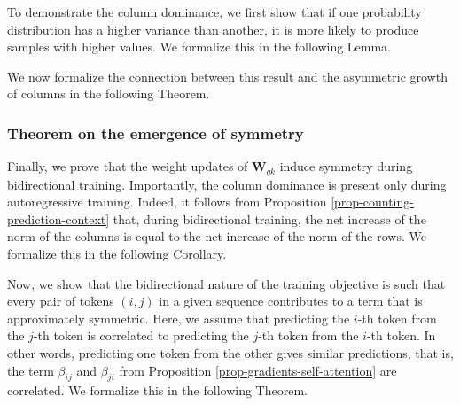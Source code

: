 %
To demonstrate the column dominance, we first show that if one probability distribution has a higher variance than another, it is more likely to produce samples with higher values.
%
We formalize this in the following Lemma.
%


%

We now formalize the connection between this result and the asymmetric growth of columns in the following Theorem.
%


%







\subsubsection{Theorem on the emergence of symmetry}
\label{supp-math-theo-symmetry-gradients}
%
Finally, we prove that the weight updates of $\bm{W}_{qk}$ induce symmetry during bidirectional training.
%
Importantly, the column dominance is present only during autoregressive training.
%
Indeed, it follows from Proposition \ref{prop-counting-prediction-context} that, during bidirectional training, the net increase of the norm of the columns is equal to the net increase of the norm of the rows.
%
We formalize this in the following Corollary.
%


%
%

Now, we show that the bidirectional nature of the training objective is such that every pair of tokens $(i,j)$ in a given sequence contributes to a term that is approximately symmetric.
%
Here, we assume that predicting the $i$-th token from the $j$-th token is correlated to predicting the $j$-th token from the $i$-th token.
%
In other words, predicting one token from the other gives similar predictions, that is, the term $\beta_{ij}$ and $\beta_{ji}$ from Proposition \ref{prop-gradients-self-attention} are correlated.
%
We formalize this in the following Theorem.
%


%

